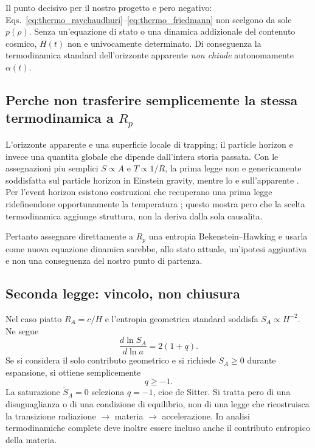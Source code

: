 \documentclass[11pt,a4paper]{article}
\begin{document}
Il punto decisivo per il nostro progetto e pero negativo: Eqs.~\eqref{eq:thermo_raychaudhuri}--\eqref{eq:thermo_friedmann} non scelgono da sole $p(\rho)$. Senza un'equazione di stato o una dinamica addizionale del contenuto cosmico, $H(t)$ non e univocamente determinato. Di conseguenza la termodinamica standard dell'orizzonte apparente \emph{non chiude} autonomamente $\alpha(t)$.

\subsection{Perche non trasferire semplicemente la stessa termodinamica a $R_p$}

L'orizzonte apparente e una superficie locale di trapping; il particle horizon e invece una quantita globale che dipende dall'intera storia passata. Con le assegnazioni piu semplici $S\propto A$ e $T\propto1/R$, la prima legge non e genericamente soddisfatta sul particle horizon in Einstein gravity, mentre lo e sull'apparente \cite{BhattacharyaDebnath2011}. Per l'event horizon esistono costruzioni che recuperano una prima legge ridefinendone opportunamente la temperatura \cite{TuChen2016}; questo mostra pero che la scelta termodinamica aggiunge struttura, non la deriva dalla sola causalita.

Pertanto assegnare direttamente a $R_p$ una entropia Bekenstein--Hawking e usarla come nuova equazione dinamica sarebbe, allo stato attuale, un'ipotesi aggiuntiva e non una conseguenza del nostro punto di partenza.

\subsection{Seconda legge: vincolo, non chiusura}

Nel caso piatto $R_A=c/H$ e l'entropia geometrica standard soddisfa $S_A\propto H^{-2}$. Ne segue
\begin{equation}
 \boxed{\frac{d\ln S_A}{d\ln a}=2(1+q).}
 \label{eq:entropy_q}
\end{equation}
Se si considera il solo contributo geometrico e si richiede $\dot S_A\ge0$ durante espansione, si ottiene semplicemente
\begin{equation}
 q\ge-1.
\end{equation}
La saturazione $\dot S_A=0$ seleziona $q=-1$, cioe de Sitter. Si tratta pero di una disuguaglianza o di una condizione di equilibrio, non di una legge che ricostruisca la transizione radiazione $\rightarrow$ materia $\rightarrow$ accelerazione. In analisi termodinamiche complete deve inoltre essere incluso anche il contributo entropico della materia.
\end{document}
